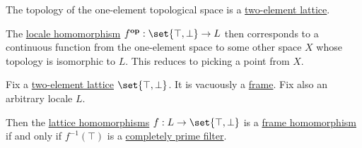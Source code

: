 \begin{remark}\label{rem:picking_a_point_from_a_locale}
  The topology of the one-element topological space is a \hyperref[thm:two_element_lattice]{two-element lattice}.

  The \hyperref[def:category_of_small_locales]{locale homomorphism} \( f^\oppos: \set{ \top, \bot } \to L \) then corresponds to a continuous function from the one-element space to some other space \( X \) whose topology is isomorphic to \( L \). This reduces to picking a point from \( X \).
\end{remark}

\begin{lemma}\label{thm:frame_homomorphism_kernel}
  Fix a \hyperref[thm:two_element_lattice]{two-element lattice} \( \set{ \top, \bot } \). It is vacuously a \hyperref[def:category_of_small_locales]{frame}. Fix also an arbitrary locale \( L \).

  Then the \hyperref[def:lattice/homomorphism]{lattice homomorphisms} \( f: L \to \set{ \top, \bot } \) is a \hyperref[def:category_of_small_frames]{frame homomorphism} if and only if \( f^{-1}(\top) \) is a \hyperref[def:lattice_ideal/prime]{completely prime filter}.
\end{lemma}
